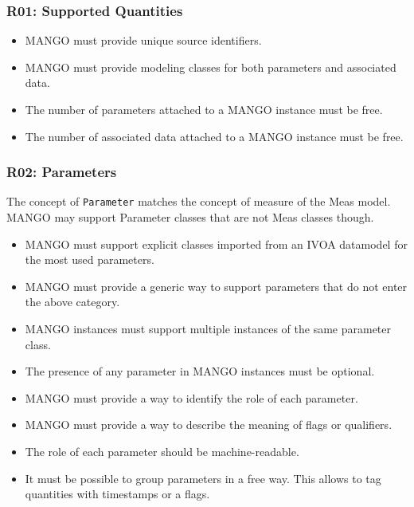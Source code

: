 \documentclass[11pt,a4paper]{ivoa}
\begin{document}

\subsubsection{R01: Supported Quantities}
\begin{itemize}
    \item MANGO must provide unique source identifiers.
    \item MANGO must provide modeling classes for both parameters and associated data.
    \item The number of parameters attached to a MANGO instance must be free.
    \item The number of associated data attached to a MANGO instance must be free.
\end{itemize}

\subsubsection{R02: Parameters}
The concept of \texttt{Parameter} matches the concept of measure of the Meas model. MANGO may support Parameter classes that are not Meas classes though.


\begin{itemize}
    \item MANGO must support explicit classes imported from an IVOA datamodel for the most used parameters.
    \item MANGO must provide a generic way to support parameters that do not enter the above category.
    \item MANGO instances must support multiple instances of the same parameter class.
    \item The presence of any parameter in MANGO instances must be optional.
    \item MANGO must provide a way to identify the role of each parameter.
     \item  MANGO must provide a way to describe the meaning of flags or qualifiers.
    \item The role of each parameter should be machine-readable.
    \item It must be possible to group parameters in a free way. This allows to tag quantities with timestamps or a flags. 
\end{itemize}
\end{document}
